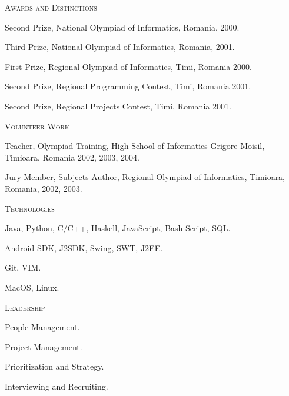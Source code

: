 \documentclass[10pt]{article}
\begin{document}
\noindent
\textcolor{Primary}{{\large \textsc{Awards and Distinctions}}}
\begin{list}{}{\leftmargin=0em}
  \setlength{\itemsep}{1pt}
  \setlength{\parskip}{0pt}
  \setlength{\parsep}{0pt}
  \item{Second Prize, National Olympiad of Informatics, Romania, 2000.}
  \item{Third Prize, National Olympiad of Informatics, Romania, 2001.}
  \item{First Prize, Regional Olympiad of Informatics, Timi, Romania 2000.}
  \item{Second Prize, Regional Programming Contest, Timi, Romania 2001.}
  \item{Second Prize, Regional Projects Contest, Timi, Romania 2001.}
\end{list}

\vspace{0.16in}

\noindent
\textcolor{Primary}{{\large \textsc{Volunteer Work}}}
\begin{list}{}{\leftmargin=0em}
  \setlength{\itemsep}{1pt}
  \setlength{\parskip}{0pt}
  \setlength{\parsep}{0pt}
  \item{Teacher, Olympiad Training, High School of Informatics Grigore Moisil, Timioara, Romania 2002, 2003, 2004.}
  \item{Jury Member, Subjects Author, Regional Olympiad of Informatics, Timioara, Romania, 2002, 2003.}
\end{list}

\vspace{0.16in}

\noindent
\textcolor{Primary}{{\large \textsc{Technologies}}}
\begin{list}{}{\leftmargin=0em}
  \setlength{\itemsep}{1pt}
  \setlength{\parskip}{0pt}
  \setlength{\parsep}{0pt}
  \item{Java, Python, C/C++, Haskell, JavaScript, Bash Script, SQL.}
  \item{Android SDK, J2SDK, Swing, SWT, J2EE.}
  \item{Git, VIM.}
  \item{MacOS, Linux.}
\end{list}

\vspace{0.16in}

\noindent
\textcolor{Primary}{{\large \textsc{Leadership}}}
\begin{list}{}{\leftmargin=0em}
  \setlength{\itemsep}{1pt}
  \setlength{\parskip}{0pt}
  \setlength{\parsep}{0pt}
  \item{People Management.}
  \item{Project Management.}
  \item{Prioritization and Strategy.}
  \item{Interviewing and Recruiting.}
\end{list}
\end{document}
